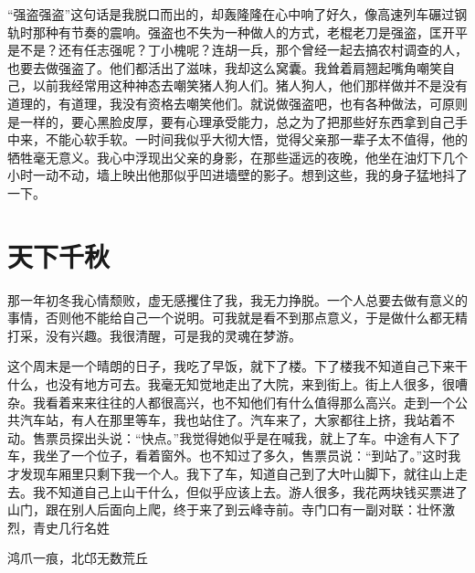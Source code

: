 \documentclass[12pt,oneside]{book}
\begin{document}
``强盗强盗''这句话是我脱口而出的，却轰隆隆在心中响了好久，像高速列车碾过钢轨时那种有节奏的震响。强盗也不失为一种做人的方式，老棍老刀是强盗，匡开平是不是？还有任志强呢？丁小槐呢？连胡一兵，那个曾经一起去搞农村调查的人，也要去做强盗了。他们都活出了滋味，我却这么窝囊。我耸着肩翘起嘴角嘲笑自己，以前我经常用这种神态去嘲笑猪人狗人们。猪人狗人，他们那样做并不是没有道理的，有道理，我没有资格去嘲笑他们。就说做强盗吧，也有各种做法，可原则是一样的，要心黑脸皮厚，要有心理承受能力，总之为了把那些好东西拿到自己手中来，不能心软手软。一时间我似乎大彻大悟，觉得父亲那一辈子太不值得，他的牺牲毫无意义。我心中浮现出父亲的身影，在那些遥远的夜晚，他坐在油灯下几个小时一动不动，墙上映出他那似乎凹进墙壁的影子。想到这些，我的身子猛地抖了一下。


\chapter{天下千秋}

那一年初冬我心情颓败，虚无感攫住了我，我无力挣脱。一个人总要去做有意义的事情，否则他不能给自己一个说明。可我就是看不到那点意义，于是做什么都无精打采，没有兴趣。我很清醒，可是我的灵魂在梦游。

这个周末是一个晴朗的日子，我吃了早饭，就下了楼。下了楼我不知道自己下来干什么，也没有地方可去。我毫无知觉地走出了大院，来到街上。街上人很多，很嘈杂。我看着来来往往的人都很高兴，也不知他们有什么值得那么高兴。走到一个公共汽车站，有人在那里等车，我也站住了。汽车来了，大家都往上挤，我站着不动。售票员探出头说：``快点。''我觉得她似乎是在喊我，就上了车。中途有人下了车，我坐了一个位子，看着窗外。也不知过了多久，售票员说：``到站了。''这时我才发现车厢里只剩下我一个人。我下了车，知道自己到了大叶山脚下，就往山上走去。我不知道自己上山干什么，但似乎应该上去。游人很多，我花两块钱买票进了山门，跟在别人后面向上爬，终于来了到云峰寺前。寺门口有一副对联：壮怀激烈，青史几行名姓

鸿爪一痕，北邙无数荒丘
\end{document}
